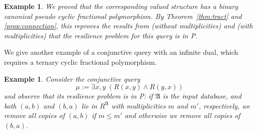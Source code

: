 \documentclass[nonacm]{acmart}
\newcommand{\bA}{{\mathfrak A}}
\newtheorem{expl}[theorem]{Example}
\begin{document}
\begin{expl}
We proved that the corresponding valued structure has a binary canonical pseudo cyclic fractional polymorphism. By Theorem~\ref{thm:tract} and \ref{prop:connection}, this reproves the results from \cite{Resilience} (without multiplicities) and \cite{LatestResilience} (with multiplicities) that the resilience problem for this query is in P.
\end{expl}

We give another example of a conjunctive query with an infinite dual, which requires a ternary cyclic fractional polymorphism.

\begin{expl} \label{expl:double-edge}
Consider the conjunctive query     
\[\mu := \exists x,y \; (R(x,y) \wedge R(y,x))\]
and observe that its resilience problem is in P: if $\bA$ is the input database, and both $(a,b)$ and $(b,a)$ lie in $R^{\bA}$ with multiplicities $m$ and $m'$, respectively, we remove all copies of $(a,b)$ if $m \leq m'$ and otherwise we remove all copies of $(b,a)$.



\end{expl}
\end{document}
